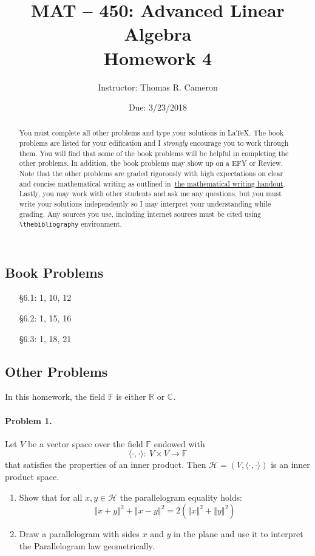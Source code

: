 \documentclass{article}
\title{MAT -- 450: Advanced Linear Algebra\\
\large{Homework 4}}
\author{Instructor: Thomas R. Cameron}
\date{Due: 3/23/2018}
\begin{document}
\maketitle

\begin{abstract}
You must complete all other problems and type your solutions in \LaTeX. The book problems are listed for your edification and I \emph{strongly} encourage you to work through them. You will find that some of the book problems will be helpful in completing the other problems. In addition, the book problems may show up on a EFY or Review. Note that the other problems are graded rigorously with high expectations on clear and concise mathematical writing as outlined in~\href{https://www.thomasrcameron.com/courses/MAT-450/handouts/math_writing.pdf}{the mathematical writing handout}. Lastly, you may work with other students and ask me any questions, but you must write your solutions independently so I may interpret your understanding while grading. Any sources you use, including internet sources must be cited using {\verb+\thebibliography+} environment. 
\end{abstract}

\subsection*{Book Problems}
\begin{itemize}
\item   [\S 6.1:] 1, 10, 12
\item   [\S 6.2:] 1, 15, 16
\item   [\S 6.3:] 1, 18, 21
\end{itemize}

\subsection*{Other Problems}

In this homework, the field $\mathbb{F}$ is either $\mathbb{R}$ or $\mathbb{C}$. 

\paragraph*{Problem 1.} Let $V$ be a vector space over the field $\mathbb{F}$ endowed with 
\[
\langle\cdot,\cdot\rangle\colon~V\times V\rightarrow\mathbb{F}
\]
that satisfies the properties of an inner product. Then $\mathcal{H}=(V,\langle\cdot,\cdot\rangle)$ is an inner product space.
\renewcommand{\theenumi}{\alph{enumi}}
\begin{enumerate}
\item	Show that for all $x,y\in\mathcal{H}$ the parallelogram equality holds:
\[
\left\Vert x+y\right\Vert^{2}+\left\Vert x-y\right\Vert^{2}=2\left(\left\Vert x\right\Vert^{2}+\left\Vert y\right\Vert^{2}\right)
\]
\item	Draw a parallelogram with sides $x$ and $y$ in the plane and use it to interpret the Parallelogram law geometrically.
\end{enumerate}
\end{document}
